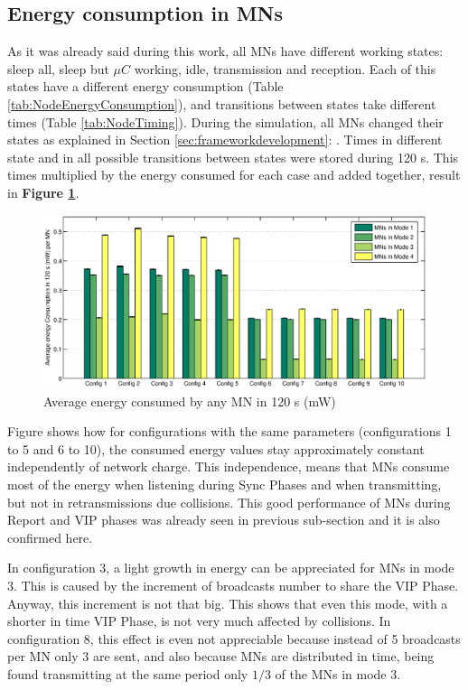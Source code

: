 \subsection{Energy consumption in \acp{MN}}

As it was already said during this work, all \acp{MN} have different working states: sleep all, sleep but $\mu C$ working, idle, transmission and 
reception. Each of this states have a different energy consumption (Table \ref{tab:NodeEnergyConsumption}), and transitions between states take 
different times (Table \ref{tab:NodeTiming}). During the simulation, all \acp{MN} changed their states as explained in Section 
\ref{sec:frameworkdevelopment}: . Times in different state and in all possible transitions between states were stored
during 120 s. This times multiplied by the energy consumed for each case and added together, result in \textbf{Figure \ref{fig:energyConsumptionPerMN}}.

\begin{figure}[ht]
 \begin{center}
  \includegraphics[width=1\textwidth]{energyConsumptionPerMN.eps}
 \end{center}
 \caption{Average energy consumed by any \ac{MN} in 120 s (mW)}
 \label{fig:energyConsumptionPerMN}
\end{figure}

Figure shows how for configurations with the same parameters (configurations 1 to 5 and 6 to 10), the consumed energy values stay approximately
constant independently of network charge. This independence, means that \acp{MN} consume most of the energy when listening during Sync Phases and 
when transmitting, but not in retransmissions due collisions. This good performance of \acp{MN} during Report and \ac{VIP} phases was already seen
in previous sub-section and it is also confirmed here. 

In configuration 3, a light growth in energy can be appreciated for \acp{MN} in mode 3. This is caused by the increment of broadcasts number to share the 
\ac{VIP} Phase. Anyway, this increment is not that big. This shows that even this mode, with a shorter in time \ac{VIP} Phase, is not very much affected
by collisions. In configuration 8, this effect is even not appreciable because instead of 5 broadcasts per \ac{MN} only 3 are sent, and also because
\acp{MN} are distributed in time, being found transmitting at the same period only $1/3$ of the \acp{MN} in mode 3.

